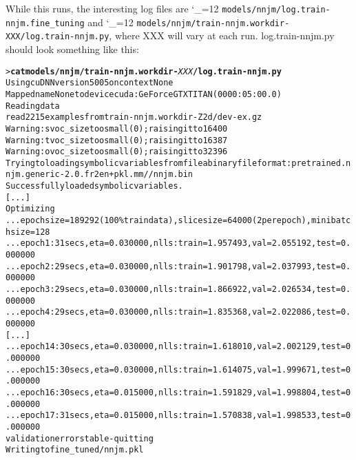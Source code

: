\documentclass[11pt,letterpaper]{article}
\def\code{\begingroup\catcode`\_=12 \codex}
\newcommand{\codex}[1]{\texttt{#1}\endgroup}
\begin{document}
While this runs, the interesting log files are \code{models/nnjm/log.train-nnjm.fine_tuning}
and \code{models/nnjm/train-nnjm.workdir-XXX/log.train-nnjm.py}, where XXX will
vary at each run. log.train-nnjm.py should look something like this:
\begin{footnotesize}
\begin{alltt}
   > \textbf{cat models/nnjm/train-nnjm.workdir-}\emph{XXX}\textbf{/log.train-nnjm.py}
   Using cuDNN version 5005 on context None
   Mapped name None to device cuda: GeForce GTX TITAN (0000:05:00.0)
   Reading data
   read 2215 examples from train-nnjm.workdir-Z2d/dev-ex.gz
   Warning: svoc_size too small (0); raising it to 16400
   Warning: tvoc_size too small (0); raising it to 16387
   Warning: ovoc_size too small (0); raising it to 32396
   Trying to loading symbolic variables from file a binary file format: pretrained.nnjm.generic-2.0.fr2en+pkl.mm//nnjm.bin
   Successfully loaded symbolic variables.
   [...]
   Optimizing
   ... epoch size = 189292 (100\% train data), slice size = 64000 (2 per epoch), minibatch size = 128
   ... epoch 1: 31 secs, eta = 0.030000, nlls: train = 1.957493, val = 2.055192, test = 0.000000
   ... epoch 2: 29 secs, eta = 0.030000, nlls: train = 1.901798, val = 2.037993, test = 0.000000
   ... epoch 3: 29 secs, eta = 0.030000, nlls: train = 1.866922, val = 2.026534, test = 0.000000
   ... epoch 4: 29 secs, eta = 0.030000, nlls: train = 1.835368, val = 2.022086, test = 0.000000
   [...]
   ... epoch 14: 30 secs, eta = 0.030000, nlls: train = 1.618010, val = 2.002129, test = 0.000000
   ... epoch 15: 30 secs, eta = 0.030000, nlls: train = 1.614075, val = 1.999671, test = 0.000000
   ... epoch 16: 30 secs, eta = 0.015000, nlls: train = 1.591829, val = 1.998804, test = 0.000000
   ... epoch 17: 31 secs, eta = 0.015000, nlls: train = 1.570838, val = 1.998533, test = 0.000000
   validation error stable - quitting
   Writing to fine_tuned/nnjm.pkl
\end{alltt}
\end{footnotesize}
\end{document}
